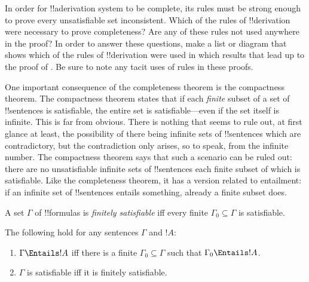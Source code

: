 \begin{prob}
In order for !!a{derivation} system to be complete, its rules must be
strong enough to prove every unsatisfiable set inconsistent.  Which of
the rules of !!{derivation} were necessary to prove completeness?  Are any
of these rules not used anywhere in the proof?  In order to answer
these questions, make a list or diagram that shows which of the rules
of !!{derivation} were used in which results that lead up to the proof of
.  Be sure to note any tacit
uses of rules in these proofs.
\end{prob}








One important consequence of the completeness theorem is the
compactness theorem.  The compactness theorem states that if each
\emph{finite} subset of a set of !!{sentence}s is satisfiable, the
entire set is satisfiable---even if the set itself is infinite. This
is far from obvious. There is nothing that seems to rule out, at first
glance at least, the possibility of there being infinite sets of
!!{sentence}s which are contradictory, but the contradiction only
arises, so to speak, from the infinite number.  The compactness
theorem says that such a scenario can be ruled out: there are no
unsatisfiable infinite sets of !!{sentence}s each finite subset of
which is satisfiable. Like the completeness theorem, it has a version
related to entailment: if an infinite set of !!{sentence}s entails
something, already a finite subset does.

\begin{defn}
  A set $\Gamma$ of !!{formula}s is \emph{finitely satisfiable} iff every finite $\Gamma_0 \subseteq \Gamma$ is satisfiable.
\end{defn}

\begin{thm}
The following hold for any sentences $\Gamma$ and $!A$:
\begin{enumerate}
  \item $\Gamma \Entails !A$ iff there is a finite $\Gamma_0
    \subseteq \Gamma$ such that $\Gamma_0 \Entails !A$.
  \item $\Gamma$ is satisfiable iff it is finitely
    satisfiable.
\end{enumerate}
\end{thm}

